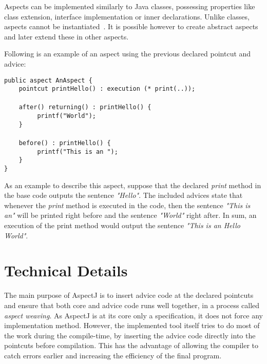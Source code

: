 \documentclass{template}
\begin{document}
Aspects can be implemented similarly to Java classes, possessing properties like class extension, interface implementation or inner declarations. Unlike classes, aspects cannot be instantiated~\cite{Kiselev2002}. It is possible however to create abstract aspects and later extend these in other aspects.

Following is an example of an aspect using the previous declared pointcut and advice:

\verb!public aspect AnAspect {!\\
\verb!    pointcut printHello() : execution (* print(..));!\\\\
\verb!    after() returning() : printHello() {!\\
\verb!         printf("World");!\\
\verb!    }!\\\\
\verb!    before() : printHello() {!\\
\verb!         printf("This is an ");!\\
\verb!    }!\\
\verb!}!

As an example to describe this aspect, suppose that the declared \textit{print} method in the base code outputs the sentence \textit{"Hello"}. The included advices state that whenever the \textit{print} method is executed in the code, then the sentence \textit{"This is an"} will be printed right before and the sentence \textit{"World"} right after. In sum, an execution of the print method would output the sentence \textit{"This is an Hello World"}.



\section{Technical Details}

The main purpose of AspectJ is to insert advice code at the declared pointcuts and ensure that
both core and advice code runs well together, in a process called \emph{aspect weaving}.
As AspectJ is at its core only a specification, it does not force any implementation method.
However, the implemented tool itself tries to do most of the work during the compile-time, by
inserting the advice code directly into the pointcuts before compilation. This has the advantage of
allowing the compiler to catch errors earlier and increasing the efficiency of the final program.
\end{document}
